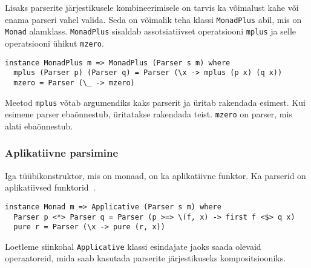 \documentclass[12pt]{article}
\begin{document}
        Lisaks parserite järjestikusele kombineerimisele on tarvis ka võimalust kahe või enama parseri vahel valida. Seda on võimalik teha klassi \verb!MonadPlus! abil, mis on \verb!Monad! alamklass. \verb!MonadPlus! sisaldab assotsiatiivset operatsiooni \verb!mplus! ja selle operatsiooni ühikut \verb!mzero!.

        \begin{verbatim}instance MonadPlus m => MonadPlus (Parser s m) where
  mplus (Parser p) (Parser q) = Parser (\x -> mplus (p x) (q x))
  mzero = Parser (\_ -> mzero)\end{verbatim}

        Meetod \verb!mplus! võtab argumendiks kaks parserit ja üritab rakendada esimest. Kui esimene parser ebaõnnestub, üritatakse rakendada teist. \verb!mzero! on parser, mis alati ebaõnnestub.
      \subsubsection{Aplikatiivne parsimine}\label{appars}
        Iga tüübikonstruktor, mis on monaad, on ka aplikatiivne funktor. Ka parserid on aplikatiivsed funktorid~\cite{App}.

        \begin{verbatim}instance Monad m => Applicative (Parser s m) where
  Parser p <*> Parser q = Parser (p >=> \(f, x) -> first f <$> q x)
  pure r = Parser (\x -> pure (r, x))\end{verbatim}

        Loetleme siinkohal \verb!Applicative! klassi esindajate jaoks saada olevaid operaatoreid, mida saab kasutada parserite järjestikuseks kompositsiooniks.
\end{document}
